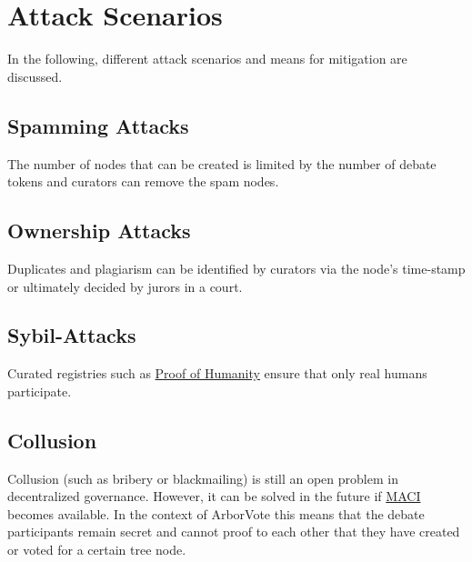\documentclass[%
aip,
amsmath,amssymb,
reprint,%
unsortedaddress,
nofootinbib
]{revtex4-2}
\begin{document}




\section{Attack Scenarios}
In the following, different attack scenarios and means for mitigation are discussed.

\subsection{Spamming Attacks}
The number of nodes that can be created is limited by the number of debate tokens and
curators can remove the spam nodes.

\subsection{Ownership Attacks}
Duplicates and plagiarism can be identified by  curators via the node's time-stamp
or ultimately decided by jurors in a court.

\subsection{Sybil-Attacks}
Curated registries such as \href{https://proofofhumanity.id/}{Proof of Humanity}
ensure that only real humans participate.


\subsection{Collusion}
Collusion (such as bribery or blackmailing) is still an open problem in decentralized governance.
However, it can be solved in the future if \href{https://ethresear.ch/t/minimal-anti-collusion-infrastructure/5413}{\ac{MACI}}\cite{Buterin2021} becomes available.
In the context of ArborVote this means that the debate participants remain secret and cannot proof to each other that they have created or voted for a certain tree node.
\end{document}
